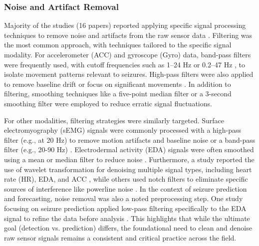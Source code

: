 \subsubsection{Noise and Artifact Removal}
Majority of the studies (16 papers) reported applying specific signal processing techniques to remove noise and artifacts from the raw sensor data \cite{Milosevic2016-ee, De_Cooman2018-pq, Wu2024-yl, Li2022-ty, Wang2025-my, Hamlin2021-sd, Chowdhury2022-bi, Gheryani2017-yg, Ge2023-ab, Xu2022-tx, Wang2025-ql, Jiang2022-zu, Yu2023-ss, Dong2022-oo, Vakilna2024-hk, Hegarty-Craver2021-hk}. Filtering was the most common approach, with techniques tailored to the specific signal modality. For accelerometer (ACC) and gyroscope (Gyro) data, band-pass filters were frequently used, with cutoff frequencies such as 1–24 Hz \cite{Wu2024-yl} or 0.2–47 Hz \cite{De_Cooman2018-pq}, to isolate movement patterns relevant to seizures. High-pass filters were also applied to remove baseline drift or focus on significant movements \cite{Milosevic2016-ee, Li2022-ty, Vakilna2024-hk, Wang2025-my}. In addition to filtering, smoothing techniques like a five-point median filter \cite{Xu2022-tx} or a 3-second smoothing filter \cite{Cogan2017-lg} were employed to reduce erratic signal fluctuations.

For other modalities, filtering strategies were similarly targeted. Surface electromyography (sEMG) signals were commonly processed with a high-pass filter (e.g., at 20 Hz) to remove motion artifacts and baseline noise \cite{Milosevic2016-ee, De_Cooman2018-pq, Li2022-ty} or a band-pass filter (e.g., 20-90 Hz) \cite{Wu2024-yl}. Electrodermal activity (EDA) signals were often smoothed using a mean or median filter to reduce noise \cite{Li2022-ty, Wang2025-ql, Yu2023-ss}. Furthermore, a study reported the use of wavelet transformation for denoising multiple signal types, including heart rate (HR), EDA, and ACC \cite{Jiang2022-zu}, while others used notch filters to eliminate specific sources of interference like powerline noise \cite{Milosevic2016-ee, Hamlin2021-sd}.
In the context of seizure prediction and forecasting, noise removal was also a noted preprocessing step. One study focusing on seizure prediction applied low-pass filtering specifically to the EDA signal to refine the data before analysis \cite{Vieluf2023-ta}. This highlights that while the ultimate goal (detection vs. prediction) differs, the foundational need to clean and denoise raw sensor signals remains a consistent and critical practice across the field.


